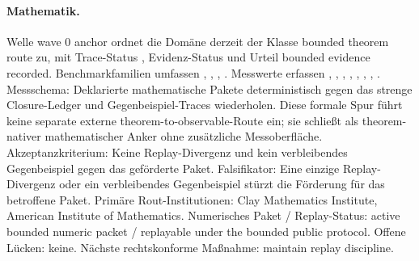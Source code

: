 \paragraph{Mathematik.}
Welle wave 0 anchor ordnet die Domäne derzeit der Klasse bounded theorem route zu, mit Trace-Status , Evidenz-Status  und Urteil bounded evidence recorded.
Benchmarkfamilien umfassen , \allowbreak {}, \allowbreak {}, \allowbreak {}.
Messwerte erfassen , \allowbreak {}, \allowbreak {}, \allowbreak {}, \allowbreak {}, \allowbreak {}, \allowbreak {}, \allowbreak {}.
Messschema: Deklarierte mathematische Pakete deterministisch gegen das strenge Closure-Ledger und Gegenbeispiel-Traces wiederholen.
Diese formale Spur führt keine separate externe theorem-to-observable-Route ein; sie schließt als theorem-nativer mathematischer Anker ohne zusätzliche Messoberfläche.
Akzeptanzkriterium: Keine Replay-Divergenz und kein verbleibendes Gegenbeispiel gegen das geförderte Paket.
Falsifikator: Eine einzige Replay-Divergenz oder ein verbleibendes Gegenbeispiel stürzt die Förderung für das betroffene Paket.
Primäre Rout-Institutionen: Clay Mathematics Institute, \allowbreak American Institute of Mathematics.
Numerisches Paket / Replay-Status: active bounded numeric packet / replayable under the bounded public protocol.
Offene Lücken: keine.
Nächste rechtskonforme Maßnahme: maintain replay discipline.

